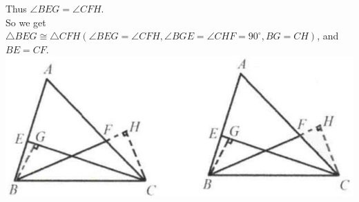 \documentclass{article}
\begin{document}
Thus \(\angle B E G=\angle C F H\).\\
So we get \(\triangle B E G \cong \triangle C F H\left(\angle B E G=\angle C F H, \angle B G E=\angle C H F=90^{\circ}, B G=C H\right)\), and \(B E=C F\).\\
\centering
\includegraphics[width=\textwidth]{images/085.jpg}
\end{document}

